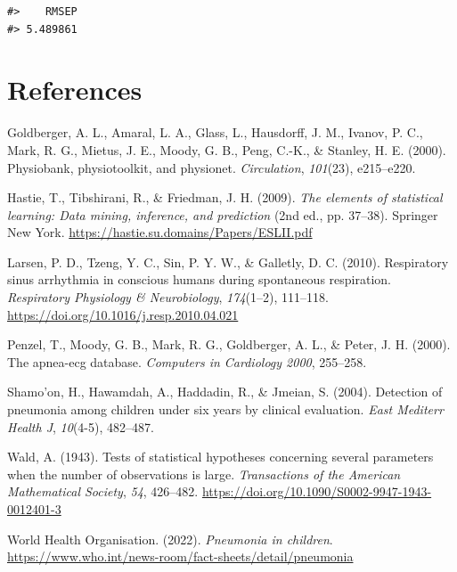 \documentclass[
]{article}
\newlength{\cslhangindent}
\newlength{\cslentryspacingunit} %
\newenvironment{CSLReferences}[2] %
 {%
  \setlength{\parindent}{0pt}
  \ifodd #1
  \let\oldpar\par
  \def\par{\hangindent=\cslhangindent\oldpar}
  \fi
  \setlength{\parskip}{#2\cslentryspacingunit}
 }%
 {}
\begin{document}
\begin{verbatim}
#>    RMSEP 
#> 5.489861
\end{verbatim}

\newpage

\hypertarget{references}{%
\section*{References}\label{references}}

\hypertarget{refs}{}
\begin{CSLReferences}{1}{1}
\leavevmode{}%
Goldberger, A. L., Amaral, L. A., Glass, L., Hausdorff, J. M., Ivanov,
P. C., Mark, R. G., Mietus, J. E., Moody, G. B., Peng, C.-K., \&
Stanley, H. E. (2000). Physiobank, physiotoolkit, and physionet.
\emph{Circulation}, \emph{101}(23), e215--e220.

\leavevmode{}%
Hastie, T., Tibshirani, R., \& Friedman, J. H. (2009). \emph{The
elements of statistical learning: Data mining, inference, and
prediction} (2nd ed., pp. 37--38). Springer New York.
\url{https://hastie.su.domains/Papers/ESLII.pdf}

\leavevmode{}%
Larsen, P. D., Tzeng, Y. C., Sin, P. Y. W., \& Galletly, D. C. (2010).
Respiratory sinus arrhythmia in conscious humans during spontaneous
respiration. \emph{Respiratory Physiology \& Neurobiology},
\emph{174}(1--2), 111--118.
\url{https://doi.org/10.1016/j.resp.2010.04.021}

\leavevmode{}%
Penzel, T., Moody, G. B., Mark, R. G., Goldberger, A. L., \& Peter, J.
H. (2000). The apnea-ecg database. \emph{Computers in Cardiology 2000},
255--258.

\leavevmode{}%
Shamo'on, H., Hawamdah, A., Haddadin, R., \& Jmeian, S. (2004).
Detection of pneumonia among children under six years by clinical
evaluation. \emph{East Mediterr Health J}, \emph{10}(4-5), 482--487.

\leavevmode{}%
Wald, A. (1943). Tests of statistical hypotheses concerning several
parameters when the number of observations is large. \emph{Transactions
of the American Mathematical Society}, \emph{54}, 426--482.
\url{https://doi.org/10.1090/S0002-9947-1943-0012401-3}

\leavevmode{}%
World Health Organisation. (2022). \emph{Pneumonia in children}.
\url{https://www.who.int/news-room/fact-sheets/detail/pneumonia}

\end{CSLReferences}
\end{document}
